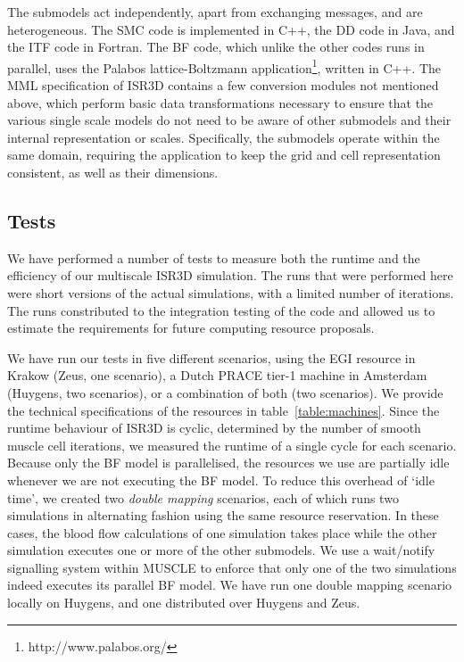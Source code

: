 \documentclass[a4,10pt]{article}
\begin{document}
The submodels act independently, apart from exchanging messages, and are
heterogeneous. The SMC code is implemented in C++, the DD code in Java, and the
ITF code in Fortran. The BF code, which unlike the other codes runs in parallel,
uses the Palabos lattice-Boltzmann
application\footnote{http://www.palabos.org/}, written in C++.  The MML
specification of ISR3D contains a few conversion modules not mentioned above,
which perform basic data transformations necessary to ensure that the various
single scale models do not need to be aware of other submodels and their
internal representation or scales. Specifically, the submodels operate within 
the same domain, requiring the application to keep the grid and cell 
representation consistent, as well as their dimensions.

\subsection{Tests}

We have performed a number of tests to measure both the runtime and the
efficiency of our multiscale ISR3D simulation. The runs that were performed 
here were short versions of the actual simulations, with a limited number of 
iterations. The runs constributed to the integration testing of the code and 
allowed us to estimate the requirements for future computing resource proposals. 

We have run our tests in five different scenarios, using the EGI resource in
Krakow (Zeus, one scenario), a Dutch PRACE tier-1 machine in Amsterdam
(Huygens, two scenarios), or a combination of both (two scenarios). We provide
the technical specifications of the resources in table~\ref{table:machines}.
Since the runtime behaviour of ISR3D is cyclic, determined by the number of
smooth muscle cell iterations, we measured the runtime of a single cycle for
each scenario. Because only the BF model is parallelised, the resources we use
are partially idle whenever we are not executing the BF model. To reduce this
overhead of `idle time', we created two {\em double mapping} scenarios, each of
which runs two simulations in alternating fashion using the same resource
reservation. In these cases, the blood flow calculations of one simulation
takes place while the other simulation executes one or more of the other
submodels. We use a wait/notify signalling system within MUSCLE to enforce that
only one of the two simulations indeed executes its parallel BF model. We have
run one double mapping scenario locally on Huygens, and one distributed over
Huygens and Zeus. 
\end{document}
